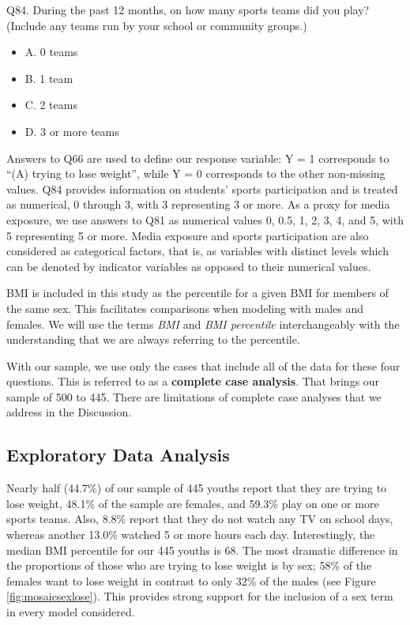 \documentclass[
]{krantz}
\providecommand{\tightlist}{%
  \setlength{\itemsep}{0pt}\setlength{\parskip}{0pt}}
\begin{document}
Q84. During the past 12 months, on how many sports teams did you play? (Include any teams run by your school or community groups.)

\begin{itemize}
\tightlist
\item
  A. 0 teams
\item
  B. 1 team
\item
  C. 2 teams
\item
  D. 3 or more teams
\end{itemize}

Answers to Q66 are used to define our response variable: Y = 1 corresponds to ``(A) trying to lose weight'', while Y = 0 corresponds to the other non-missing values. Q84 provides information on students' sports participation and is treated as numerical, 0 through 3, with 3 representing 3 or more. As a proxy for media exposure, we use answers to Q81 as numerical values 0, 0.5, 1, 2, 3, 4, and 5, with 5 representing 5 or more. Media exposure and sports participation are also considered as categorical factors, that is, as variables with distinct levels which can be denoted by indicator variables as opposed to their numerical values.

BMI is included in this study as the percentile for a given BMI for members of the same sex. This facilitates comparisons when modeling with males and females. We will use the terms \emph{BMI} and \emph{BMI percentile} interchangeably with the understanding that we are always referring to the percentile.

With our sample, we use only the cases that include all of the data for these four questions. This is referred to as a \textbf{complete case analysis}. That brings our sample of 500 to 445. There are limitations of complete case analyses that we address in the Discussion.

\hypertarget{exploratory-data-analysis-2}{%
\subsection{Exploratory Data Analysis}\label{exploratory-data-analysis-2}}

Nearly half (44.7\%) of our sample of 445 youths report that they are trying to lose weight, 48.1\% of the sample are females, and 59.3\% play on one or more sports teams. Also, 8.8\% report that they do not watch any TV on school days, whereas another 13.0\% watched 5 or more hours each day. Interestingly, the median BMI percentile for our 445 youths is 68. The most dramatic difference in the proportions of those who are trying to lose weight is by sex; 58\% of the females want to lose weight in contrast to only 32\% of the males (see Figure \ref{fig:mosaicsexlose}). This provides strong support for the inclusion of a sex term in every model considered.
\end{document}
